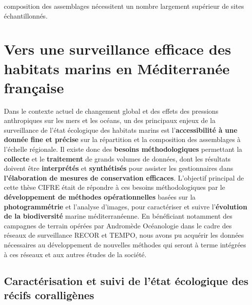 composition des assemblages nécessitent un nombre largement supérieur de sites échantillonnés.

\section{Vers une surveillance efficace des habitats marins en Méditerranée française}\label{discussion.2}

Dans le contexte actuel de changement global et des effets des pressions anthropiques sur les mers et les océans, un des principaux enjeux de la surveillance de l’état écologique des habitats marins est l’\textbf{accessibilité à une donnée fine et précise} sur la répartition et la composition des assemblages à l’échelle régionale. Il existe donc des \textbf{besoins méthodologiques} permettant la \textbf{collecte} et le \textbf{traitement} de grands volumes de données, dont les résultats doivent être \textbf{interprétés} et \textbf{synthétisés} pour assister les gestionnaires dans \textbf{l’élaboration de mesures de conservation efficaces}. L’objectif principal de cette thèse CIFRE était de répondre à ces besoins méthodologiques par le \textbf{développement de méthodes opérationnelles} basées sur la \textbf{photogrammétrie} et l’analyse d’images, pour caractériser et suivre l’\textbf{évolution de la biodiversité} marine méditerranéenne. En bénéficiant notamment des campagnes de terrain opérées par Andromède Océanologie dans le cadre des réseaux de surveillance RECOR et TEMPO, nous avons pu acquérir les données nécessaires au développement de nouvelles méthodes qui seront à terme intégrées à ces réseaux et aux autres études de la société.

\subsection{Caractérisation et suivi de l’état écologique des récifs coralligènes}

